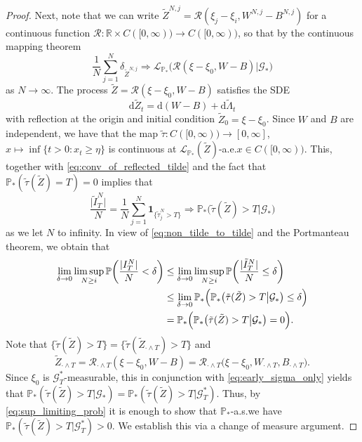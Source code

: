\documentclass[11pt, a4paper]{article}
\theoremstyle{plain}
\theoremstyle{definition}
\theoremstyle{remark}
\numberwithin{equation}{section}
\newcommand{\pr}{\mathbb{P}}
\newcommand{\R}{\mathbb{R}}
\renewcommand{\L}{\mathcal{L}}
\renewcommand{\d}{\mathrm{d}}
\newcommand{\define}{\mathpunct{:}}
\renewcommand{\bf}[1]{\mathbf{#1}}
\renewcommand{\cal}[1]{\mathcal{#1}}
\begin{document}
\begin{proof}
Next, note that we can write $\tilde{Z}^{N, j} = \cal{R}(\xi_j - \xi_i, W^{N, j} - B^{N, j})$ for a continuous function $\cal{R} \define \R \times C([0, \infty)) \to C([0, \infty))$, so that by the continuous mapping theorem
\begin{equation} \label{eq:conv_of_reflected_tilde}
    \frac{1}{N} \sum_{j = 1}^N \delta_{\tilde{Z}^{N, j}} \Rightarrow \L_{\pr_{\ast}}\bigl(\cal{R}(\xi - \xi_0, W - B)\big\vert \cal{G}_{\ast}\bigr)
\end{equation}
as $N \to \infty$. The process $\tilde{Z} = \cal{R}(\xi - \xi_0, W - B)$ satisfies the SDE
\begin{equation}
    \d \tilde{Z}_t = \d (W - B) + \d \tilde{\Lambda}_t
\end{equation}
with reflection at the origin and initial condition $\tilde{Z}_0 = \xi - \xi_0$. Since $W$ and $B$ are independent, we have that the map $\tilde{\tau} \define C([0, \infty)) \to [0, \infty]$, $x \mapsto \inf\{t > 0 \define x_t \geq \eta\}$ is continuous at $\L_{\pr_{\ast}}(\tilde{Z})$-a.e.\@ $x \in C([0, \infty))$. This, together with \eqref{eq:conv_of_reflected_tilde} and the fact that $\pr_{\ast}(\tilde{\tau}(\tilde{Z}) = T) = 0$ implies that
\begin{equation*}
    \frac{\lvert \tilde{I}^N_T\rvert}{N} = \frac{1}{N} \sum_{j = 1}^N \bf{1}_{\{\tilde{\tau}^N_j > T\}} \Rightarrow \pr_{\ast}\bigl(\tilde{\tau}(\tilde{Z}) > T \big\vert \cal{G}_{\ast}\bigr)
\end{equation*}
as we let $N$ to infinity. In view of \eqref{eq:non_tilde_to_tilde} and the Portmanteau theorem, we obtain that
\begin{align} \label{eq:sup_limiting_prob}
    \lim_{\delta \to 0} \limsup_{N \geq i} \pr\biggl(\frac{\lvert I^N_T\rvert}{N} < \delta\biggr) &\leq \lim_{\delta \to 0} \limsup_{N \geq i} \pr\biggl(\frac{\lvert \tilde{I}^N_T\rvert}{N} \leq \delta \biggr) \notag \\
    &\leq \lim_{\delta \to 0} \pr_{\ast}\Bigl(\pr_{\ast}\bigl(\tilde{\tau}(\tilde{Z}) > T \big\vert \cal{G}_{\ast}\bigr) \leq \delta \Bigr) \notag \\
    &= \pr_{\ast}\Bigl(\pr_{\ast}\bigl(\tilde{\tau}(\tilde{Z}) > T \big\vert \cal{G}_{\ast}\bigr) = 0 \Bigr).
\end{align}
Note that $\{\tilde{\tau}(\tilde{Z}) > T\} = \{\tilde{\tau}(\tilde{Z}_{\cdot \land T}) > T\}$ and
\begin{equation*}
    \tilde{Z}_{\cdot \land T} = \cal{R}_{\cdot \land T}(\xi - \xi_0, W - B) = \cal{R}_{\cdot \land T}\bigl(\xi - \xi_0, W_{\cdot \land T}, B_{\cdot \land T}\bigr).
\end{equation*}
Since $\xi_0$ is $\cal{G}^{\ast}_T$-measurable, this in conjunction with \eqref{eq:early_sigma_only} yields that $\pr_{\ast}(\tilde{\tau}(\tilde{Z}) > T \vert \cal{G}_{\ast}) = \pr_{\ast}(\tilde{\tau}(\tilde{Z}) > T \vert \cal{G}^{\ast}_T)$. Thus, by \eqref{eq:sup_limiting_prob} it is enough to show that $\pr_{\ast}$-a.s.\@ we have $\pr_{\ast}(\tilde{\tau}(\tilde{Z}) > T \vert \cal{G}^{\ast}_T) > 0$. We establish this via a change of measure argument.


\end{proof}
\end{document}
